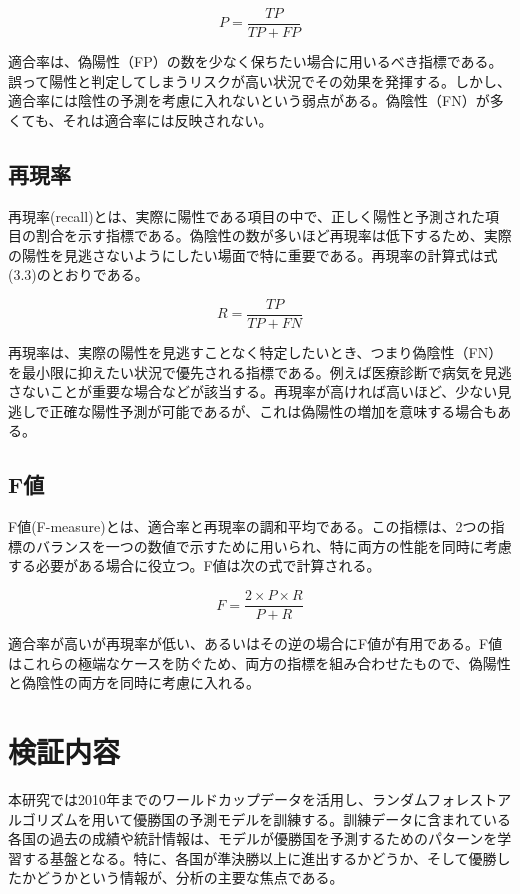 \documentclass[platex]{suribt}
\begin{document}
\begin{equation}
  P = \frac{TP}{TP + FP}
\end{equation}


適合率は、偽陽性（FP）の数を少なく保ちたい場合に用いるべき指標である。誤って陽性と判定してしまうリスクが高い状況でその効果を発揮する。しかし、適合率には陰性の予測を考慮に入れないという弱点がある。偽陰性（FN）が多くても、それは適合率には反映されない。
\subsection{再現率}
再現率(recall)とは、実際に陽性である項目の中で、正しく陽性と予測された項目の割合を示す指標である。偽陰性の数が多いほど再現率は低下するため、実際の陽性を見逃さないようにしたい場面で特に重要である。再現率の計算式は式(3.3)のとおりである。

\begin{equation}
  R = \frac{TP}{TP + FN}
\end{equation}

再現率は、実際の陽性を見逃すことなく特定したいとき、つまり偽陰性（FN）を最小限に抑えたい状況で優先される指標である。例えば医療診断で病気を見逃さないことが重要な場合などが該当する。再現率が高ければ高いほど、少ない見逃しで正確な陽性予測が可能であるが、これは偽陽性の増加を意味する場合もある。
\subsection{F値}
F値(F-measure)とは、適合率と再現率の調和平均である。この指標は、2つの指標のバランスを一つの数値で示すために用いられ、特に両方の性能を同時に考慮する必要がある場合に役立つ。F値は次の式で計算される。

\begin{equation}
F = \frac{2 \times P \times R}{P + R}
\end{equation}

適合率が高いが再現率が低い、あるいはその逆の場合にF値が有用である。F値はこれらの極端なケースを防ぐため、両方の指標を組み合わせたもので、偽陽性と偽陰性の両方を同時に考慮に入れる。
\section{検証内容}
本研究では2010年までのワールドカップデータを活用し、ランダムフォレストアルゴリズムを用いて優勝国の予測モデルを訓練する。訓練データに含まれている各国の過去の成績や統計情報は、モデルが優勝国を予測するためのパターンを学習する基盤となる。特に、各国が準決勝以上に進出するかどうか、そして優勝したかどうかという情報が、分析の主要な焦点である。
\end{document}
